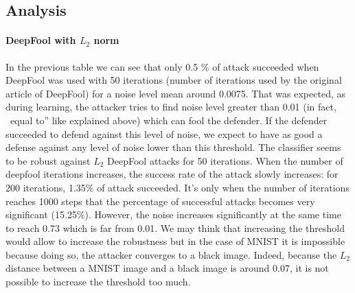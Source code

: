 \documentclass[12pt]{article}
\begin{document}
\begin{center}
\end{center}

\subsection{Analysis}
\paragraph{DeepFool with $L_{2}$ norm}
In the previous table we can see that only 0.5 $\%$ of attack succeeded when DeepFool was used with 50 iterations (number of iterations used by the original article of DeepFool) for a noise level mean around 0.0075. That was expected, as during learning, the attacker tries to find noise level greater than 0.01 (in fact, ~equal to” like explained above) which can fool the defender. If the defender succeeded to defend against this level of noise, we expect to have as good a defense against any level of noise lower than this threshold. The classifier seems to be robust against $L_{2}$ DeepFool attacks for 50 iterations.
When the number of deepfool iterations increases, the success rate of the attack slowly increases: for 200 iterations, 1.35$\%$ of attack succeeded. It’s only when the number of iterations reaches 1000 steps that the percentage of successful attacks becomes very significant (15.25$\%$). However, the noise increases significantly at the same time to reach 0.73 which is far from 0.01.
We may think that increasing the threshold would allow to increase the robustness but in the case of MNIST it is impossible because doing so, the attacker converges to a black image. Indeed, because the $L_{2}$ distance between a MNIST image and a black image is around 0.07, it is not possible to increase the threshold too much.
\end{document}

